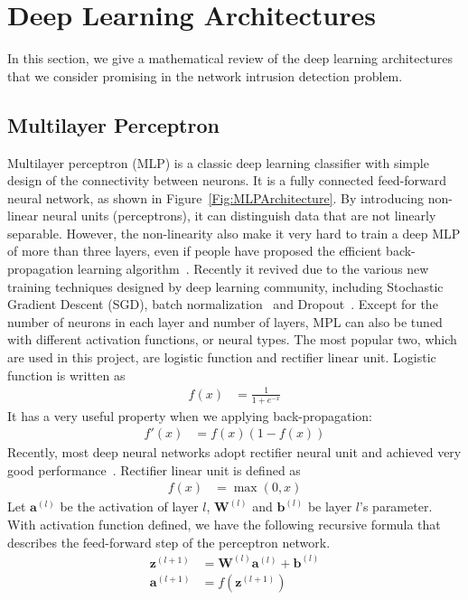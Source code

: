 \section{Deep Learning Architectures}
\label{Sec:Architectures}
In this section, we give a mathematical review of the deep learning architectures that
we consider promising in the network intrusion detection problem.

\subsection{Multilayer Perceptron}
Multilayer perceptron (MLP) is a classic deep learning classifier with simple
design of the connectivity between neurons.
It is a fully connected feed-forward neural network, as shown in Figure~\ref{Fig:MLPArchitecture}.
By introducing non-linear neural units (perceptrons), it can distinguish data that are
not linearly separable.
However, the non-linearity also make it very hard to train a deep MLP of more than three layers,
even if people have proposed the efficient back-propagation learning algorithm~\cite{Backpropagation}.
Recently it revived due to the various new training techniques designed by deep learning community,
including Stochastic Gradient Descent (SGD),
batch normalization~\cite{BatchNorm} and Dropout~\cite{Dropout}.
Except for the number of neurons in each layer and number of layers,
MPL can also be tuned with different activation functions, or neural types.
The most popular two, which are used in this project, are logistic function
and rectifier linear unit.
Logistic function is written as
\begin{align}
    f(x) &= \frac{1}{1 + e^{-x}}
\end{align}
It has a very useful property when we applying back-propagation:
\begin{align}
    f'(x) &= f(x) (1-f(x))
\end{align}
Recently, most deep neural networks adopt rectifier neural unit and
achieved very good performance~\cite{DeepLearning}.
Rectifier linear unit is defined as
\begin{align}
    f(x) &= \max(0, x)
\end{align}
Let $\mathbf{a}^{(l)}$ be the activation of layer $l$,
$\mathbf{W}^{(l)}$ and $\mathbf{b}^{(l)}$ be layer $l$'s parameter.
With activation function defined, we have the following recursive formula that describes
the feed-forward step of the perceptron network.
\begin{align}
    \mathbf{z}^{(l+1)} &= \mathbf{W}^{(l)} \mathbf{a}^{(l)} + \mathbf{b}^{(l)} \label{Equ:MLPFeedForward1}\\
    \mathbf{a}^{(l+1)} &= f(\mathbf{z}^{(l+1)})
    \label{Equ:MLPFeedForward2}
\end{align}

